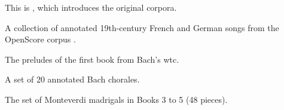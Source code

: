 
This is , which introduces the
original corpora.


A collection of annotated 19th-century French and German
songs from the OpenScore corpus
\textcite{gotham2022openscore}.


The preludes of the first book from Bach's \gls{wtc}. 


A set of 20 annotated Bach chorales. 


The set of Monteverdi madrigals in Books 3 to 5 (48 pieces).
